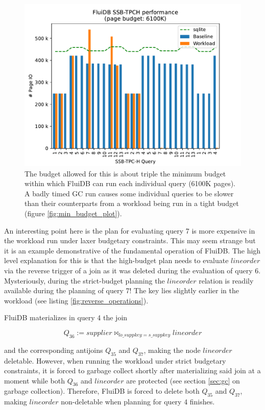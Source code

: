 \begin{figure}[H]
\centering
\includegraphics[width=.9\linewidth]{./plans/workload_6100K.pdf}
\caption{\label{fig:large_budget_plot} \ioperfdescr The budget
  allowed for this is about triple the minimum budget within which
  FluiDB can run each individual query (6100K pages). A badly timed GC
  run causes some individual queries to be slower than their
  counterparts from a workload being run in a tight budget (figure
  \ref{fig:min_budget_plot}).}
\end{figure}

An interesting point here is the plan for evaluating query 7 is more
expensive in the workload run under laxer budgetary constraints. This
may seem strange but it is an example demonstrative of the fundamental
operation of FluiDB. The high level explanation for this is that the
high-budget plan needs to evaluate \(\mathit{lineorder}\) via the
reverse trigger of a join as it was deleted during the evaluation of
query 6. Mysteriously, during the strict-budget planning the
\(\mathit{lineorder}\) relation is readily available during the
planning of query 7! The key lies slightly earlier in the workload
(see listing \ref{fig:reverse_operations}).

FluiDB materializes in query 4 the join

\[
Q_{36} := \mathit{supplier} \Join_{\mathit{lo\_suppkey} = \mathit{s\_suppkey}} \mathit{lineorder}
\]

and the corresponding antijoins \(Q_{35}\) and \(Q_{37}\), making the
node \(\mathit{lineorder}\) deletable. However, when running the
workload under strict budgetary constraints, it is forced to garbage
collect shortly after materializing said join at a moment while both
\(Q_{36}\) and \(\mathit{lineorder}\) are protected (see section
\ref{sec:gc} on garbage collection). Therefore, FluiDB is forced to
delete both \(Q_{35}\) and \(Q_{37}\), making \(\mathit{lineorder}\)
non-deletable when planning for query 4 finishes.

